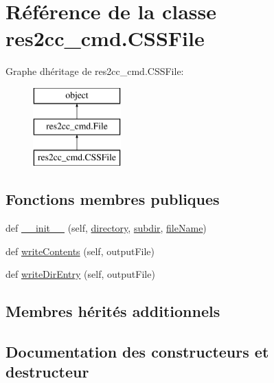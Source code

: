 \hypertarget{classres2cc__cmd_1_1_c_s_s_file}{}\section{Référence de la classe res2cc\+\_\+cmd.\+C\+S\+S\+File}
\label{classres2cc__cmd_1_1_c_s_s_file}
Graphe d\textquotesingle{}héritage de res2cc\+\_\+cmd.\+C\+S\+S\+File\+:\begin{figure}[H]
\begin{center}
\leavevmode
\includegraphics[height=3.000000cm]{classres2cc__cmd_1_1_c_s_s_file}
\end{center}
\end{figure}
\subsection*{Fonctions membres publiques}
\begin{DoxyCompactItemize}
\item 
def \hyperlink{classres2cc__cmd_1_1_c_s_s_file_a366397bca9c60b560eea0154f68f844b}{\+\_\+\+\_\+init\+\_\+\+\_\+} (self, \hyperlink{classres2cc__cmd_1_1_file_ac4d2f8723afe8f54e99abc605b1f0cc6}{directory}, \hyperlink{classres2cc__cmd_1_1_file_ae6919ea0849ff51ff2679de78b50f44c}{subdir}, \hyperlink{classres2cc__cmd_1_1_file_ae2daaffd697b334701ec4a53d6c5e86d}{file\+Name})
\item 
def \hyperlink{classres2cc__cmd_1_1_c_s_s_file_aaa1cd3cf96590f83a01eae27e9529a33}{write\+Contents} (self, output\+File)
\item 
def \hyperlink{classres2cc__cmd_1_1_c_s_s_file_a12875ea25e1eec1b289ec321fdbc78cb}{write\+Dir\+Entry} (self, output\+File)
\end{DoxyCompactItemize}
\subsection*{Membres hérités additionnels}


\subsection{Documentation des constructeurs et destructeur}
\hypertarget{classres2cc__cmd_1_1_c_s_s_file_a366397bca9c60b560eea0154f68f844b}{}
